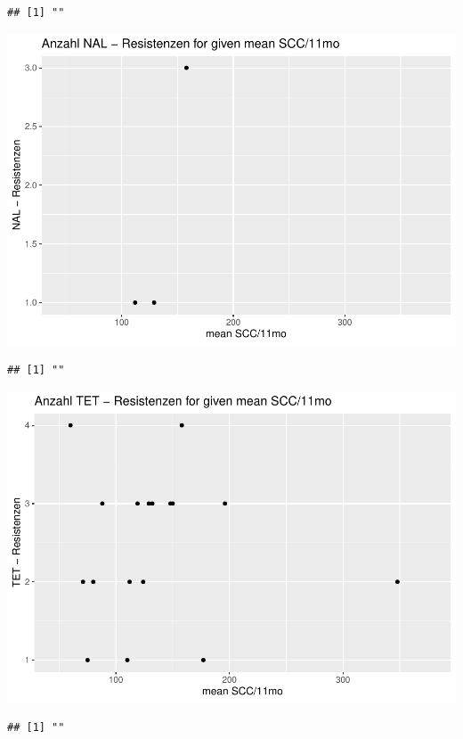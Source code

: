 \documentclass[
]{article}
\begin{document}
\begin{verbatim}
## [1] ""
\end{verbatim}

\includegraphics{NResistenzen_files/figure-latex/numerical_variables-17.pdf}

\begin{verbatim}
## [1] ""
\end{verbatim}

\includegraphics{NResistenzen_files/figure-latex/numerical_variables-18.pdf}

\begin{verbatim}
## [1] ""
\end{verbatim}
\end{document}
